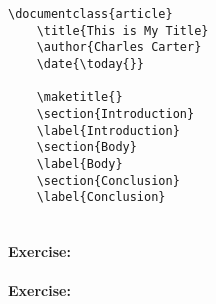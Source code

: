         \begin{verbatim}
\documentclass{article}
    \title{This is My Title}
    \author{Charles Carter}
    \date{\today{}}
 
    \maketitle{}
    \section{Introduction}
    \label{Introduction}
    \section{Body}
    \label{Body}
    \section{Conclusion}
    \label{Conclusion}
    
        \end{verbatim}

        \paragraph{Exercise:}

        \paragraph{Exercise:}

